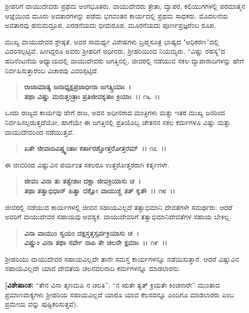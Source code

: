 ಶ‍್ರೀಹರಿಗೆ ವಾಯುದೇವರು ಪ್ರಥಮ ಅಂಗಭೂತರು. ವಾಯುದೇವರು ತ್ರೇತಾ, ದ್ವಾಪರ, ಕಲಿಯುಗಗಳಲ್ಲಿ ಪರಮಾತ್ಮನ ಆಜ್ಞೆಯಿಂದ ಮೂರು ಅವತಾರಗಳನ್ನು ಪಡೆದು ಭಗವಂತನ ಕಾರ್ಯದಲ್ಲಿ ಪ್ರಥಮ ಸಾಧಕರು. ಮೊದಲನೆಯ ಅವತಾರವು ಹನುಮದ್ರೂಪ, ಎರಡನೆಯದು ಭೀಮರೂಪ, ಮೂರನೆಯದು ಪೂರ್ಣಪ್ರಜ್ಞರೆಂಬ ರೂಪ,

ಮುಖ್ಯ ವಾಯುದೇವರ ಶ್ರೇಷ್ಠತೆ, ಅವರ ಸಾಮರ್ಥ್ಯ ವಿಶೇಷಗಳು ಬ್ರಹ್ಮಸೂತ್ರ ಭಾಷ್ಯದ "ಅಧಿಕರಣ”ದಲ್ಲಿ ವಿವರಿಸಲ್ಪಟ್ಟಿವೆ. ಹೀಗಿದ್ದರೂ ಅವರು ಶ‍್ರೀಹರಿಗೆ ಅಧೀನರು, ಶ‍್ರೀಹರಿಯಿಂದ ನಿಯಮ್ಯರು. “ವಿಷ್ಣು ರಹಸ್ಯ"ದ ಹದಿನೆಂಟನೆಯ ಅಧ್ಯಾಯದಲ್ಲಿ ವಾಯುದೇವರು ಜಗತ್ತಿನಲ್ಲಿ, ಜೀವರಲ್ಲಿ ನಡೆಯುವ ಸಕಲ ವ್ಯಾಪಾರಾದಿಗಳನ್ನು ಹೇಗೆ ನಿರ್ವಹಿಸುತ್ತಾರೆಂಬ ವಿಚಾರವು ವಿವರಿಸ್ಪಟ್ಟಿದೆ.

\begin{verse}
\textbf{ರಾಜಾಮಾತ್ಯ ಜನಾಧ್ಯಕ್ಷಪ್ರಜಾಧೀನಾ ಜಗತ್ಕ್ರಿಯಾಃ~।}\\\textbf{ತಥಾ ವಿಷ್ಣು ಮರುತ್ತಂತ್ರಾಃ ಪ್ರತಿಜೀವಕೃತಾಃ ಕ್ರಿಯಾಃ~।। ೧೬~।।}
\end{verse}

ಒಂದು ರಾಜ್ಯದ ಕಾರ್ಯವು ಹೇಗೆ ರಾಜ, ಅವನ ಅಧೀನರಾದ ಮಂತ್ರಿಗಳು ಮತ್ತು ಇತರ ಮುಖ್ಯ ಜನರಿಂದ ನಿರ್ವಹಿಸಲ್ಪಡುತ್ತದೆಯೋ, ಹಾಗೆಯೇ ಈ ಜಗತ್ತಿನಲ್ಲಿ ಪ್ರತಿಯೊಬ್ಬ ಚೇತನನ ಸಕಲ ಕರ್ಮಗಳೂ ವಿಷ್ಣು ಮತ್ತು ವಾಯುದೇವರಿಂದ ನಡೆಯುತ್ತವೆ.

\begin{verse}
\textbf{ಏತೇ ಜೀವಾದಿವಿಷ್ಣ್ವಂತಾಃ ಕರ್ತಾರಶ್ಚೋತ್ತರೋತ್ತರಮ್~।। ೧೭~।।}
\end{verse}

ಈ ಜೀವರಿಂದ ವಿಷ್ಣುವಿನ ಪರ್ಯಂತ ಸಕಲರೂ ಉತ್ತರೋತ್ತರರಾಗಿ ಕರ್ತೃಗಳೇ.

\begin{verse}
\textbf{ಜೀವಂ ವಿನಾ ತು ತತ್ವೇಶಾಃ ದಕ್ಷಾ ಜೀವಕ್ರಿಯಾಸು ಚ~।}\\\textbf{ತಥಾ ತತ್ವಾಭಿಧಾನ್ ಹಿತ್ವಾ ದಕ್ಷೋ ವಾಯುಶ್ಚ ತತ್ ಕೃತೌ~।। ೧೮~।।}
\end{verse}

ಜೀವರಲ್ಲಿ ನಡೆಯುವ ಕಾರ್ಯಗಳಲ್ಲಿ ಜೀವನ ಸಹಾಯವಿಲ್ಲದೆ ತತ್ವಾಭಿಮಾನಿ ದೇವತೆಗಳೇ ಸಮರ್ಥರು. ಆದರೆ ಅವರಿಗೆ ವಾಯುದೇವರ ಸಹಾಯವು ಅವಶ್ಯಕ. ವಾಯುದೇವರಿಗೆ ತತ್ವಾಭಿಮಾನಿದೇವತೆಗಳ ಸಹಾಯ ಬೇಕಿಲ್ಲ.

\begin{verse}
\textbf{ವಿನಾ ವಾಯುಂ ಸ್ವಯಂ ದಕ್ಷಸ್ತತ್ತಸ್ಸರ್ವಕ್ರಿಯಾಸು ಚ~।}\\\textbf{ವಿಷ್ಣುಂ ವಿನಾ ತಥಾ ಸರ್ವೇ ನಾಪಿ ತೇ ಚಲನೇ ಕ್ಷಮಾಃ~।। ೧೯~।।}
\end{verse}

ಶ‍್ರೀಹರಿಯು ವಾಯುದೇವರ ಸಹಾಯವಿಲ್ಲದೇ ತಾನೇ ಸಮಸ್ತ ಕಾರ್ಯಗಳನ್ನೂ ನಡೆಯಿಸುತ್ತಾನೆ. ಆದರೆ ವಿಷ್ಣುವಿನ ಸಹಾಯವಿಲ್ಲದೇ ಯಾವ ದೇವತೆಯ ಚಲನವಲನಾದಿ ಕರ್ಮಗಳನ್ನೂ ಮಾಡಲಾರನು.

\textbf{[ವಿಶೇಷಾಂಶ:} “ತೇನ ವಿನಾ ತೃಣಮಪಿ ನ ಚಲತಿ”, “ನ ಋತೇ ತ್ವತ್ ಕ್ರಿಯತೇ ಕಿಂಚನಾರೇ'' ಮುಂತಾದ ಪ್ರಮಾಣವಾಕ್ಯಗಳು ಶ‍್ರೀಹರಿಯ ಸಹಾಯವಿಲ್ಲದೆ ಯಾರೂ ಯಾವ ಕೆಲಸವನ್ನೂ ಎಂದಿಗೂ ಮಾಡಲಾರರು ಎಂಬ ಪ್ರಮೇಯ ವನ್ನು ಪುಷ್ಟಿಕರಿಸುತ್ತವೆ).

